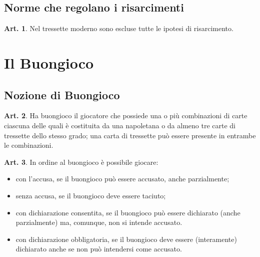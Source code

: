 \documentclass[italian,a4paper]{article}
\theoremstyle{definition}
\newtheorem{art}{Art.}
\begin{document}
\subsection{Norme che regolano i risarcimenti}
\begin{art}
Nel tressette moderno sono escluse tutte le ipotesi di risarcimento.
\end{art}
\section{Il Buongioco}
\subsection{Nozione di Buongioco}
\begin{art}
Ha buongioco il giocatore che possiede una o più combinazioni di carte ciascuna delle quali è costituita da una napoletana o da almeno tre carte di tressette dello stesso grado; una carta di tressette può essere presente in entrambe le combinazioni.
\end{art}
\begin{art}
In ordine al buongioco è possibile giocare:
\begin{itemize}
\item    con l'accusa, se il buongioco può essere accusato, anche parzialmente;
\item    senza accusa, se il buongioco deve essere taciuto;
\item     con dichiarazione consentita, se il buongioco può essere dichiarato (anche parzialmente) ma, comunque, non si intende accusato.
\item    con dichiarazione obbligatoria, se il buongioco deve essere (interamente) dichiarato anche se non può intendersi come accusato.
    \end{itemize}
\end{art}
\end{document}
